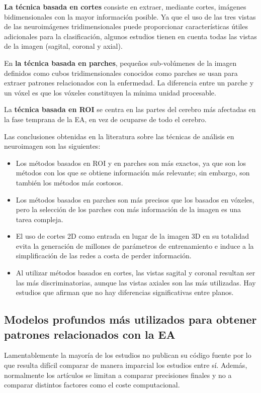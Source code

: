 \textbf{La técnica basada en cortes} consiste en extraer, mediante cortes, imágenes bidimensionales con la mayor información
posible.
Ya que el uso de las tres vistas de las neuroimágenes tridimensionales puede proporcionar características
útiles adicionales para la clasificación, algunos estudios tienen en cuenta todas las vistas de la imagen (sagital,
coronal y axial).

En \textbf{la técnica basada en parches}, pequeños sub-volúmenes de la imagen definidos como cubos tridimensionales conocidos
como parches se usan para extraer patrones relacionados con la enfermedad.
La diferencia entre un parche y un vóxel es que los vóxeles constituyen la mínima unidad procesable.

La \textbf{técnica basada en ROI} se centra en las partes del cerebro más afectadas en la fase temprana de la EA, en vez de
ocuparse de todo el cerebro.

Las conclusiones obtenidas en la literatura sobre las técnicas de análisis en neuroimagen son las siguientes:
\begin{itemize}
    \item Los métodos basados en ROI y en parches son más exactos, ya que son los métodos con los que se obtiene
    información más relevante;
    sin embargo, son también los métodos más costosos.
    \item Los métodos basados en parches son más precisos que los basados en vóxeles, pero la selección de los parches
    con más información de la imagen es una tarea compleja.
    \item El uso de cortes 2D como entrada en lugar de la imagen 3D en su totalidad evita la generación de millones de
    parámetros de entrenamiento e induce a la simplificación de las redes a costa de perder información.
    \item Al utilizar métodos basados en cortes, las vistas sagital y coronal resultan ser las más discriminatorias,
    aunque las vistas axiales son las más utilizadas.
    Hay estudios que afirman que no hay diferencias significativas entre planos.\\
\end{itemize}

\subsection{Modelos profundos más utilizados para obtener patrones relacionados con la EA}
\label{subsec:modelos-profundos-estado-del-arte}
Lamentablemente la mayoría de los estudios no publican su código fuente por lo que resulta difícil comparar de manera
imparcial los estudios entre sí.
Además, normalmente los artículos se limitan a comparar precisiones finales y no a comparar distintos factores como el
coste computacional.

